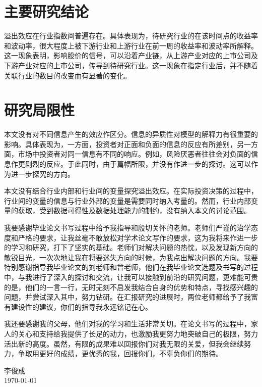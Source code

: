 \documentclass{sysuthesis}
\begin{document}
\section{主要研究结论}

溢出效应在行业指数间普遍存在。具体表现为，待研究行业的在该时间点的收益率和波动率，很大程度上被下游行业和上游行业在前一周的收益率和波动率所解释。这一现象表明，影响股价的信号，可以沿着产业链，从上游产业对应的上市公司及下游产业对应的上市公司，传导到待研究行业。这一现象在指定行业后，并不随着关联行业的数目的改变而有显著的变化。

\section{研究局限性}

本文没有对不同信息产生的效应作区分。信息的异质性对模型的解释力有很重要的影响。具体表现为，一方面，投资者对正面和负面的信息的反应有所差别，另一方面，市场中投资者对同一信息有不同的响应。例如，风险厌恶者往往会对负面的信息作更剧烈的反应。于此同时，由于篇幅所限，并没有作进一步的探讨。这可以作为进一步探究的方向。

本文没有结合行业内部和行业间的变量探究溢出效应。在实际投资决策的过程中，行业间的变量的信息与行业外部的变量是需要同时纳入考量的。然而，行业内部变量的获取，受到数据可得性及数据处理能力的制约，没有纳入本文的讨论范围。

\songti

\appendix

\begin{thankto}

\songti{}

我要感谢毕业论文书写过程中给予我指导和殷切关怀的老师。老师们严谨的治学态度和严格的要求，让我丝毫不敢放松对学术论文写作的要求，这为我将来作进一步的学习和研究，打下了坚实的基础。老师们对解决问题的热忱，以及发现新方向的敏锐目光，一次次地让我在将要迷失方向的时候，为我点出解决问题的方向。我要特别感谢指导我毕业论文的刘老师和曾老师，他们在我毕业论文选题及书写的过程中，与我进行了深入的探讨和交流，让我可以接触到前沿的研究问题，更难能可贵的是，他们的一言一行，无时无刻不启发我结合自身的优势和特点，寻找感兴趣的问题，并尝试深入其中，努力钻研。在汇报研究的进展时，两位老师都给予了我富有建设性的建议，你们的指导我永远铭记在心。

我还要感谢我的父母，他们对我的学习和生活非常关切。在论文书写的过程中，家人的关心和支持给我提供了长足的动力，也激励我更努力地突破自己的极限，努力活出新的高度。虽然，有限的成果难以回报你们对我无限的关爱，但我会继续努力，争取用更好的成绩，更优秀的我，回报你们，不辜负你们的期待。

\vskip 18pt
\begin{flushright}
李俊成\\
\today
\end{flushright}
\end{thankto}
\end{document}
